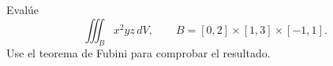 Evalúe
\[
\iiint_B x^2yz\,dV,
\qquad
B=[0,2]\times[1,3]\times[-1,1].
\]
Use el teorema de Fubini para comprobar el resultado.
